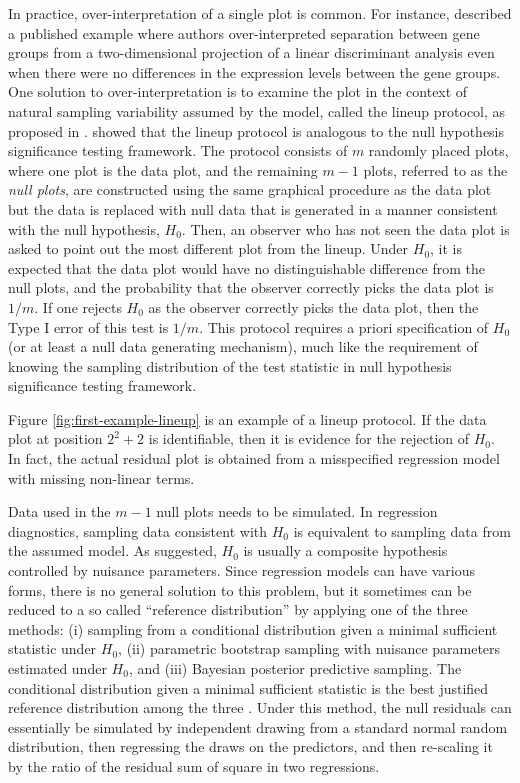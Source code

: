 \documentclass[]{interact}
\theoremstyle{plain}%
\theoremstyle{definition}
\theoremstyle{remark}
\begin{document}
In practice, over-interpretation of a single plot is common. For
instance, \citet{roy2015using} described a published example where
authors over-interpreted separation between gene groups from a
two-dimensional projection of a linear discriminant analysis even when
there were no differences in the expression levels between the gene
groups. One solution to over-interpretation is to examine the plot in
the context of natural sampling variability assumed by the model, called
the lineup protocol, as proposed in \citet{buja2009statistical}.
\citet{majumder2013validation} showed that the lineup protocol is
analogous to the null hypothesis significance testing framework. The
protocol consists of \(m\) randomly placed plots, where one plot is the
data plot, and the remaining \(m - 1\) plots, referred to as the
\emph{null plots}, are constructed using the same graphical procedure as
the data plot but the data is replaced with null data that is generated
in a manner consistent with the null hypothesis, \(H_0\). Then, an
observer who has not seen the data plot is asked to point out the most
different plot from the lineup. Under \(H_0\), it is expected that the
data plot would have no distinguishable difference from the null plots,
and the probability that the observer correctly picks the data plot is
\(1/m\). If one rejects \(H_0\) as the observer correctly picks the data
plot, then the Type I error of this test is \(1/m\). This protocol
requires a priori specification of \(H_0\) (or at least a null data
generating mechanism), much like the requirement of knowing the sampling
distribution of the test statistic in null hypothesis significance
testing framework.

Figure \ref{fig:first-example-lineup} is an example of a lineup
protocol. If the data plot at position \(2^2 + 2\) is identifiable, then
it is evidence for the rejection of \(H_0\). In fact, the actual
residual plot is obtained from a misspecified regression model with
missing non-linear terms.

Data used in the \(m - 1\) null plots needs to be simulated. In
regression diagnostics, sampling data consistent with \(H_0\) is
equivalent to sampling data from the assumed model. As
\citet{buja2009statistical} suggested, \(H_0\) is usually a composite
hypothesis controlled by nuisance parameters. Since regression models
can have various forms, there is no general solution to this problem,
but it sometimes can be reduced to a so called ``reference
distribution'' by applying one of the three methods: (i) sampling from a
conditional distribution given a minimal sufficient statistic under
\(H_0\), (ii) parametric bootstrap sampling with nuisance parameters
estimated under \(H_0\), and (iii) Bayesian posterior predictive
sampling. The conditional distribution given a minimal sufficient
statistic is the best justified reference distribution among the three
\citep{buja2009statistical}. Under this method, the null residuals can
essentially be simulated by independent drawing from a standard normal
random distribution, then regressing the draws on the predictors, and
then re-scaling it by the ratio of the residual sum of square in two
regressions.
\end{document}
